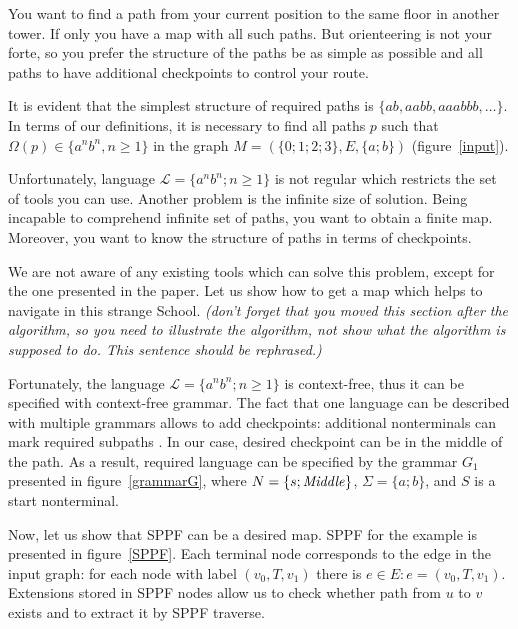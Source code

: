 You want to find a path from your current position to the same floor in another tower. 
If only you have a map with all such paths.
But orienteering is not your forte, so you prefer the structure of the paths be as simple as possible and all paths to have additional checkpoints to control your route.

It is evident that the simplest structure of required paths is $\{ab, aabb, aaabbb, \dots\}$.
In terms of our definitions, it is necessary to find all paths $p$ such that $\Omega(p) \in \{a^n b^n, n \geq 1\}$ in the graph $M=(\{0;1;2;3\},E,\{a;b\})$ (figure~\ref{input}).

Unfortunately, language $\mathcal{L} = \{a^n b^n; n \geq 1\}$ is not regular which restricts the set of tools you can use. 
Another problem is the infinite size of solution. Being incapable to comprehend infinite set of paths, you want to obtain a finite map.  
Moreover, you want to know the structure of paths in terms of checkpoints.

We are not aware of any existing tools which can solve this problem, except for the one presented in the paper.
Let us show how to get a map which helps to navigate in this strange School. \emph{(don't forget that you moved this section after the algorithm, so you need to illustrate the algorithm, not show what the algorithm is supposed to do. This sentence should be rephrased.)}

Fortunately, the language $\mathcal{L} = \{a^n b^n; n \geq 1\}$ is context-free, thus it can be specified with context-free grammar. 
The fact that one language can be described with multiple grammars allows to add checkpoints: additional nonterminals can mark required subpaths .
In our case, desired checkpoint can be in the middle of the path.
As a result, required language can be specified by the grammar $G_1$ presented in figure~\ref{grammarG}, where $N = \{s; \text{\textit{Middle}}\}$, $\Sigma = \{a; b\}$, and $S$ is a start nonterminal.

Now, let us show that SPPF can be a desired map.
SPPF for the example is presented in figure~\ref{SPPF}.
Each terminal node corresponds to the edge in the input graph: for each node with label $(v_0, T, v_1)$ there is $e\in E: e=(v_0,T,v_1)$.
Extensions stored in SPPF nodes allow us to check whether path from $u$ to $v$ exists and to extract it by SPPF traverse. 

